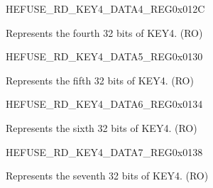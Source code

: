 \begin{register}{H}{EFUSE\_RD\_KEY4\_DATA4\_REG}{0x012C}\label{regdesc:EFUSERDKEY4DATA4REG}
%
\regnewline%
\begin{regdesc}\begin{reglist}
\label{fielddesc:EFUSEKEY4DATA4}\item [EFUSE\_KEY4\_DATA4] Represents the fourth 32 bits of KEY4. (RO)
\end{reglist}\end{regdesc}
\end{register}


\begin{register}{H}{EFUSE\_RD\_KEY4\_DATA5\_REG}{0x0130}\label{regdesc:EFUSERDKEY4DATA5REG}
%
\regnewline%
\begin{regdesc}\begin{reglist}
\label{fielddesc:EFUSEKEY4DATA5}\item [EFUSE\_KEY4\_DATA5] Represents the fifth 32 bits of KEY4. (RO)
\end{reglist}\end{regdesc}
\end{register}


\begin{register}{H}{EFUSE\_RD\_KEY4\_DATA6\_REG}{0x0134}\label{regdesc:EFUSERDKEY4DATA6REG}
%
\regnewline%
\begin{regdesc}\begin{reglist}
\label{fielddesc:EFUSEKEY4DATA6}\item [EFUSE\_KEY4\_DATA6] Represents the sixth 32 bits of KEY4. (RO)
\end{reglist}\end{regdesc}
\end{register}


\begin{register}{H}{EFUSE\_RD\_KEY4\_DATA7\_REG}{0x0138}\label{regdesc:EFUSERDKEY4DATA7REG}
%
\regnewline%
\begin{regdesc}\begin{reglist}
\label{fielddesc:EFUSEKEY4DATA7}\item [EFUSE\_KEY4\_DATA7] Represents the seventh 32 bits of KEY4. (RO)
\end{reglist}\end{regdesc}
\end{register}


